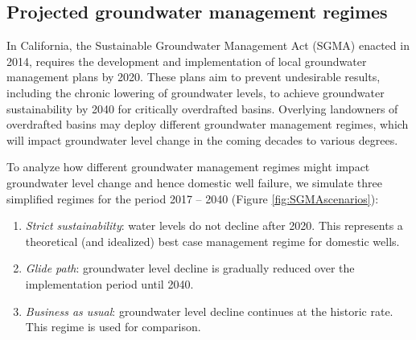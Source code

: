 \subsection{Projected groundwater management regimes}

In California, the Sustainable Groundwater Management Act (SGMA) enacted in 2014, requires the development and implementation of local groundwater management plans by 2020. These plans aim to prevent undesirable results, including the chronic lowering of groundwater levels, to achieve groundwater sustainability by 2040 for critically overdrafted basins.
Overlying landowners of overdrafted basins may deploy different groundwater management regimes, which will impact groundwater level change in the coming decades to various degrees.  

To analyze how different groundwater management regimes might impact groundwater level change and hence domestic well failure, we simulate three simplified regimes for the period 2017 -- 2040 (Figure \ref{fig:SGMAscenarios}): 

\begin{enumerate}
	\item \textit{Strict sustainability}: water levels do not decline after 2020. This represents a theoretical (and idealized) best case management regime for domestic wells.  
	\item \textit{Glide path}: groundwater level decline is gradually reduced over the implementation period until 2040.  
	\item \textit{Business as usual}: groundwater level decline continues at the historic rate. This regime is used for comparison.  
\end{enumerate}


